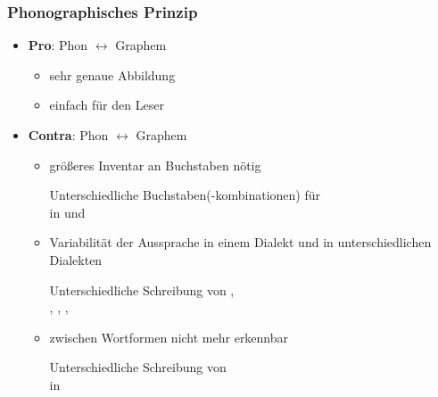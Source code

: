 \begin{frame}
\frametitle{Phonographisches Prinzip}

\begin{itemize}
	
	\item \textbf{Pro}: Phon $\leftrightarrow$ Graphem

	\begin{itemize}
		\item sehr genaue Abbildung
		\item einfach für den Leser
	\end{itemize}

\pause 
	
	\item \textbf{Contra}: Phon $\leftrightarrow$ Graphem
	
	\begin{itemize}
		\item größeres Inventar an Buchstaben nötig
		
		\ea Unterschiedliche Buchstaben(-kombinationen) für \\
		\zB in  und 
		\z 

\pause 		

		\item Variabilität der Aussprache in einem Dialekt und in unterschiedlichen Dialekten
		
		\ea Unterschiedliche Schreibung von ,\\
		\zB {}, , , 
		\z 

\pause 
		
		\item {} zwischen Wortformen nicht mehr erkennbar
		
		\ea Unterschiedliche Schreibung von \\
		\zB in  \vs {}
		\z 
	\end{itemize}
\end{itemize}

\end{frame}


